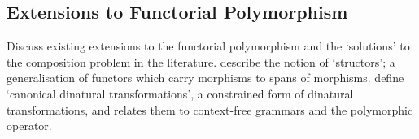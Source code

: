 \documentclass[../../Dissertation.tex]{subfiles}
\begin{document}
\subsection{Extensions to Functorial Polymorphism}
Discuss existing extensions to the functorial polymorphism and the `solutions' to the composition problem in the literature.
\newline\newline
{} describe the notion of `structors'; a generalisation of functors which carry morphisms to spans of morphisms.
\newline\newline
{} define `canonical dinatural transformations', a constrained form of dinatural transformations, and relates them to context-free grammars and the polymorphic operator.
\end{document}
